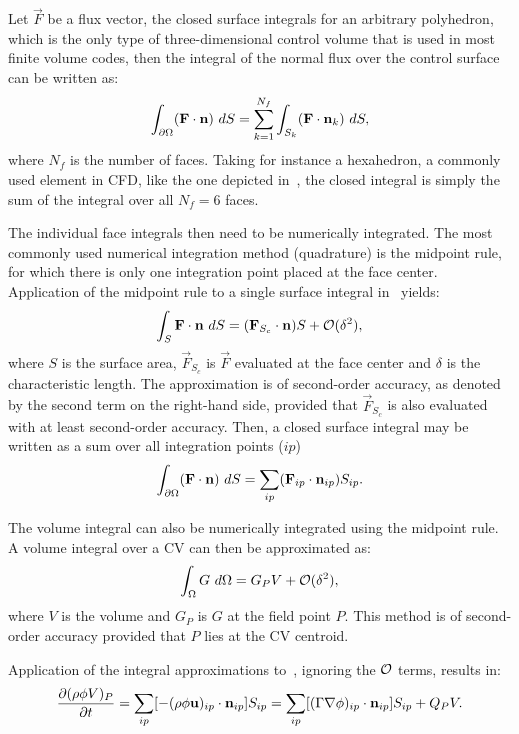Let $\vec{F}$ be a flux vector, the closed surface integrals for an arbitrary polyhedron, which is the only type of three-dimensional control volume that is used in most finite volume codes, then the integral of the normal flux over the control surface can be written as:
\begin{equation}
    \int_{\partial \Omega} (\mathbf{F}\cdot \mathbf{n})~dS = \sum_{k=1}^{N_f} \int_{S_k} (\mathbf{F}\cdot\mathbf{n}_k)~dS
    \label{eq:surfint},
\end{equation}
where $N_f$ is the number of faces. Taking for instance a hexahedron, a commonly used element in CFD, like the one depicted in~, the closed integral is simply the sum of the integral over all $N_f = 6$ faces.

The individual face integrals then need to be numerically integrated. The most commonly used numerical integration method (quadrature) is the midpoint rule, for which there is only one integration point placed at the face center. Application of the midpoint rule to a single surface integral in~ yields:
\begin{equation*}
   \int_{S} \mathbf{F}\cdot\mathbf{n}~dS = (\mathbf{F}_{S_c}\cdot\mathbf{n}) S + \mathcal{O}(\delta^2),
\end{equation*}
where $S$ is the surface area, $\vec{F}_{S_c}$ is $\vec{F}$ evaluated at the face center and $\delta$ is the characteristic length.  The approximation is of second-order accuracy, as denoted by the second term on the right-hand side, provided that $\vec{F}_{S_c}$ is also evaluated with at least second-order accuracy. Then, a closed surface integral may be written as a sum over all integration points ($ip$)
\begin{equation*}
    \int_{\partial \Omega} (\mathbf{F}\cdot\mathbf{n})~dS = \sum_{ip} (\mathbf{F}_{ip}\cdot\mathbf{n}_{ip}) S_{ip}.
\end{equation*}

The volume integral can also be numerically integrated using the midpoint rule. A volume integral over a CV can then be approximated as:
\begin{equation*}
    \int_\Omega G~d\Omega = G_{P} V + \mathcal{O}(\delta^2),
\end{equation*}
where $V$ is the volume and $G_{P}$ is $G$ at the field point $P$. This method is of second-order accuracy provided that $P$ lies at the CV centroid.

Application of the integral approximations to~, ignoring the $\mathcal{O}$ terms, results in:
\begin{equation}
     \frac{\partial (\rho\phi V )_P}{\partial t} 
    =
    \sum_{ip} [-(\rho\phi\mathbf{u})_{ip}\cdot\mathbf{n}_{ip}] S_{ip}
    = \sum_{ip} [(\Gamma\nabla\phi)_{ip}\cdot\mathbf{n}_{ip}] S_{ip}
    + Q_P V
    \label{eq:spatial}.
\end{equation}

